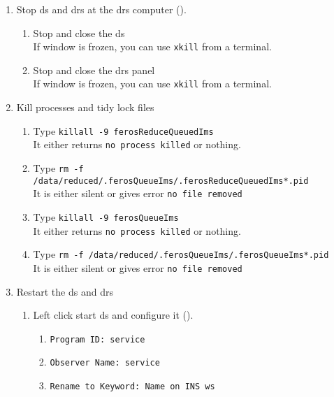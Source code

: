 \documentclass[11pt,fleqn,a4paper]{book}
\begin{document}
\label{proc:FEROSDRSrestart}
  \begin{enumerate} 
    \item \label{list:stopDRS}Stop \gls{ds} and \gls{drs} at the \gls{drs} computer ().
      \begin{enumerate}
          \item Stop and close the \gls{ds}\\
                If window is frozen, you can use \texttt{xkill} from a terminal.
          \item Stop and close the \gls{drs} panel\\
                If window is frozen, you can use \texttt{xkill} from a terminal.
      \end{enumerate}
    \item \label{list:killDRS}Kill processes and tidy lock files
    \begin{enumerate}
    \item Type \texttt{killall -9 ferosReduceQueuedIms}\\
          It either returns \texttt{no process killed} or nothing.  
    \item Type \texttt{rm -f /data/reduced/.ferosQueueIms/.ferosReduceQueuedIms*.pid}\\
          It is either silent or gives error \texttt{no file removed}
    \item Type \texttt{killall -9 ferosQueueIms}\\
          It either returns \texttt{no process killed} or nothing.  
    \item Type \texttt{rm -f /data/reduced/.ferosQueueIms/.ferosQueueIms*.pid}\\
          It is either silent or gives error \texttt{no file removed}
    \end{enumerate}
    \item Restart the \gls{ds} and \gls{drs}
    \begin{enumerate}
        \item \label{list:DS} Left click start \gls{ds} and configure it  ().
            \begin{enumerate}
                \item \texttt{Program ID: service}
                \item \texttt{Observer Name: service}
                \item \texttt{Rename to Keyword: Name on INS ws}

\end{enumerate}
\end{enumerate}
\end{enumerate}
\end{document}

